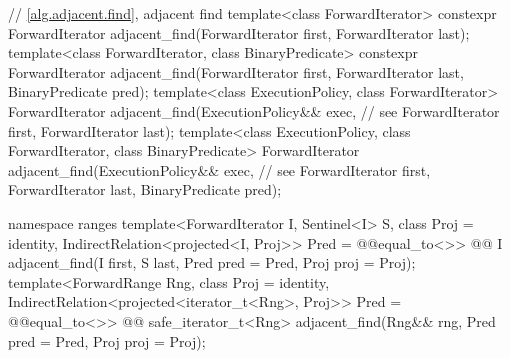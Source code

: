 \begin{codeblock}
  // \ref{alg.adjacent.find}, adjacent find
  template<class ForwardIterator>
    constexpr ForwardIterator
      adjacent_find(ForwardIterator first, ForwardIterator last);
  template<class ForwardIterator, class BinaryPredicate>
    constexpr ForwardIterator
      adjacent_find(ForwardIterator first, ForwardIterator last,
                    BinaryPredicate pred);
  template<class ExecutionPolicy, class ForwardIterator>
    ForwardIterator
      adjacent_find(ExecutionPolicy&& exec, // see 
                    ForwardIterator first, ForwardIterator last);
  template<class ExecutionPolicy, class ForwardIterator, class BinaryPredicate>
    ForwardIterator
      adjacent_find(ExecutionPolicy&& exec, // see 
                    ForwardIterator first, ForwardIterator last,
                    BinaryPredicate pred);
\end{codeblock}\begin{addedblock}\begin{codeblock}
  namespace ranges {
    template<ForwardIterator I, Sentinel<I> S, class Proj = identity,
        IndirectRelation<projected<I, Proj>> Pred = @@equal_to<>>
      @@ I adjacent_find(I first, S last, Pred pred = Pred{},
                                Proj proj = Proj{});
    template<ForwardRange Rng, class Proj = identity,
        IndirectRelation<projected<iterator_t<Rng>, Proj>> Pred = @@equal_to<>>
      @@ safe_iterator_t<Rng>
        adjacent_find(Rng&& rng, Pred pred = Pred{}, Proj proj = Proj{});
  }
\end{codeblock}\end{addedblock}\begin{codeblock}


\end{codeblock}
